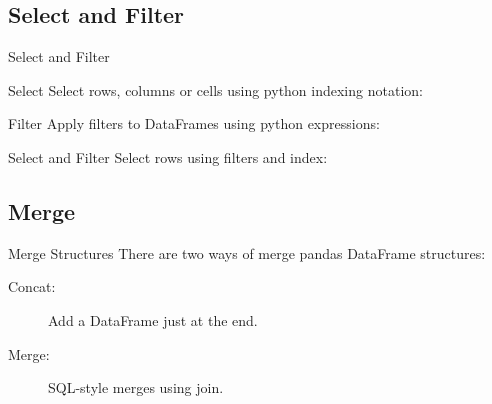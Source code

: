 \documentclass[final, 9pt, svgnames]{beamerPerdy}
\begin{document}



  \subsection{Select and Filter}
  \begin{frame}{Select and Filter}
		\begin{block}{Select}
			Select rows, columns or cells using python indexing notation:
			\selectCode
		\end{block}
		\begin{block}{Filter}
			Apply filters to DataFrames using python expressions:
			\filterCode
		\end{block}
		\begin{block}{Select and Filter}
			Select rows using filters and index:
			\selectAndFilterCode
		\end{block}
  \end{frame}

  \subsection{Merge}
  \begin{frame}{Merge Structures}
		There are two ways of merge pandas DataFrame structures:
		\begin{description}
			\item[Concat:] Add a DataFrame just at the end.
			\item[Merge:] SQL-style merges using join.
		\end{description}
  \end{frame}
\end{document}
